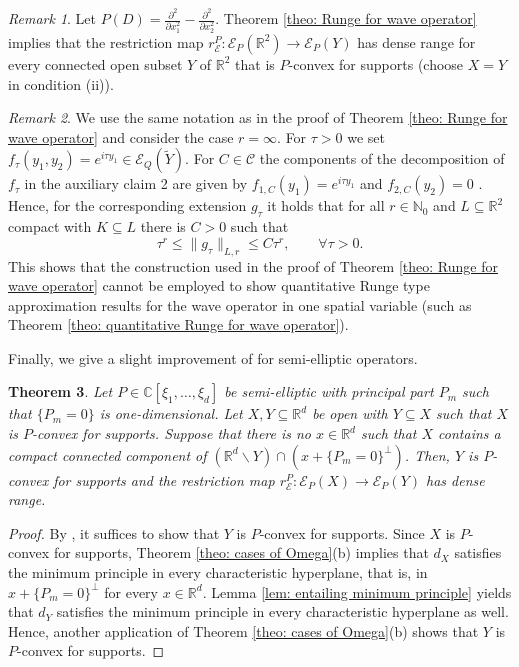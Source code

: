 \documentclass[12pt]{amsart}
\newcommand{\N}{\mathbb{N}}
\newcommand{\R}{\mathbb{R}}
\newcommand{\C}{\mathbb{C}}
\newtheorem{theorem}{Theorem}[section]
\theoremstyle{definition}
\theoremstyle{remark}
\newtheorem{remark}[theorem]{Remark}
\numberwithin{equation}{section}
\begin{document}
	\begin{remark} Let $P(D)=\frac{\partial^2}{\partial x_1^2}-\frac{\partial^2}{\partial x_2^2}$. Theorem \ref{theo: Runge for wave operator} implies that the restriction map $r_{\mathscr{E}}^P:\mathscr{E}_P(\R^2)\rightarrow\mathscr{E}_P(Y)$ has dense range for every connected open subset $Y$ of $\R^2$ that is $P$-convex for supports (choose $X = Y$ in condition (ii)).
\end{remark}



\begin{remark}\label{rem: Runge for one dimensional wave operator}  We use the same notation as in the proof of Theorem \ref{theo: Runge for wave operator} and consider the case $r=\infty$. For $\tau > 0$ we set $f_\tau(y_1,y_2)=e^{i\tau y_1}\in\mathscr{E}_Q(\tilde{Y})$. For $C\in\mathscr{C}$  the  components of the decomposition of $f_\tau$ in the auxiliary claim 2  are given by  $f_{1,C}(y_1)=e^{i\tau y_1}$ and $f_{2,C}(y_2)=0$ . Hence, for the corresponding extension  $g_\tau$ it holds that for all $r \in \N_0$ and $L \subseteq \R^2$ compact with $K \subseteq L$ there is $C > 0$ such that
$$
\tau^r \leq \| g_\tau \|_{L,r} \leq C \tau^r, \qquad \forall \tau > 0.
$$
This shows that  the construction used in the proof of Theorem \ref{theo: Runge for wave operator} cannot be employed to show quantitative Runge type approximation results for the  wave operator in one spatial variable (such as Theorem \ref{theo: quantitative Runge for wave operator}).
	\end{remark}
Finally, we give a slight improvement of \cite[Theorem 1]{Kalmes21} for semi-elliptic operators.

\begin{theorem}\label{theo: qualitative Runge for single characteristic direction}
	Let $P\in\C[\xi_1,\ldots,\xi_d]$ be semi-elliptic  with principal part $P_m$ such that $\{P_m=0\}$ is one-dimensional. Let $X,Y\subseteq\R^d$ be open with $Y \subseteq X$ such that $X$ is  $P$-convex for supports. Suppose that there is no $x\in\R^d$ such that $X$ contains a compact connected component of $(\R^d\backslash Y)\cap(x+\{P_m=0\}^\perp)$. Then, $Y$ is $P$-convex for supports and the restriction map $r_\mathscr{E}^P: \mathscr{E}_P(X)\rightarrow\mathscr{E}_P(Y)$ has dense range.
\end{theorem}

\begin{proof}
	By  \cite[Theorem 1]{Kalmes21}, it suffices to show that  $Y$ is $P$-convex for supports. Since $X$ is $P$-convex for supports,  Theorem \ref{theo: cases of Omega}(b) implies that $d_X$ satisfies the minimum principle in every characteristic hyperplane, that is, in $x+\{P_m=0\}^\perp$ for every $x\in\R^d$. Lemma \ref{lem: entailing minimum principle} yields that $d_Y$ satisfies the minimum principle in every characteristic hyperplane as well. Hence, another application of Theorem \ref{theo: cases of Omega}(b) shows that  $Y$ is $P$-convex for supports. 
\end{proof}
\end{document}
